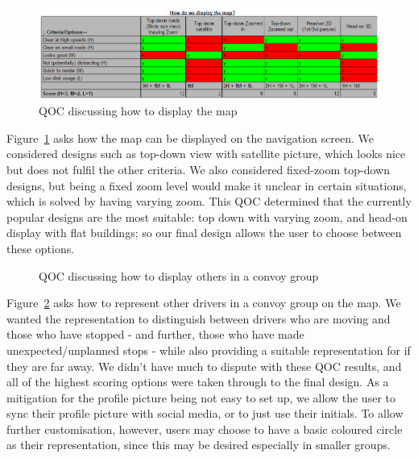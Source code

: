 \documentclass{article}
\begin{document}
\begin{figure}[H]
  \centering
  \includegraphics[width=\linewidth]{qoc-nav-map}
  \caption{QOC discussing how to display the map}\label{qoc-map}
\end{figure}
Figure~\ref{qoc-map} asks how the map can be displayed on the navigation screen. We considered designs such as top-down view with satellite picture, which looks nice but does not fulfil the other criteria. We also considered fixed-zoom top-down designs, but being a fixed zoom level would make it unclear in certain situations, which is solved by having varying zoom. This QOC determined that the currently popular designs are the most suitable: top down with varying zoom, and head-on display with flat buildings; so our final design allows the user to choose between these options.

\begin{figure}[H]
  \centering
  \caption{QOC discussing how to display others in a convoy group}\label{qoc-convoy}
\end{figure}
Figure~\ref{qoc-convoy} asks how to represent other drivers in a convoy group on the map. We wanted the representation to distinguish between drivers who are moving and those who have stopped - and further, those who have made unexpected/unplanned stops - while also providing a suitable representation for if they are far away. We didn't have much to dispute with these QOC results, and all of the highest scoring options were taken through to the final design. As a mitigation for the profile picture being not easy to set up, we allow the user to sync their profile picture with social media, or to just use their initials. To allow further customisation, however, users may choose to have a basic coloured circle as their representation, since this may be desired especially in smaller groups.
\end{document}
